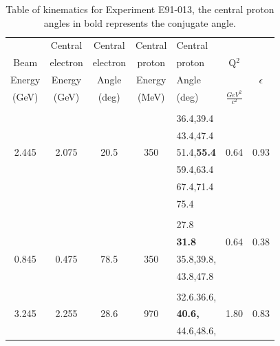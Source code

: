 \documentclass[aps,prl,twocolumn,showpacs,amsmath,amssymb,floats]{revtex4}
\begin{document}
\begin{table}
\caption[Table of kinematics for Experiment E91-013]{Table of kinematics for 
Experiment E91-013, the central proton angles in bold represents the conjugate
angle.} 
\label{kmat}
\begin{center}
\begin{tabular}{|c|c|c|c|l|c|c|} \hline \hline
       &Central  &Central  & Central& Central   &          &        \\ 
Beam   &electron &electron & proton & proton    &Q$^2$     &        \\
Energy &Energy &Angle    & Energy & Angle     &          &$\epsilon$\\
(GeV)  &(GeV)  &(deg)   &  (MeV) & (deg)          &$\frac{GeV^2}{c^2}$ & \\ \hline 
\hline
       &         &         &        &           &          &         \\
       &         &         &        & 36.4,39.4 &          &         \\
       &         &         &        & 43.4,47.4 &          &         \\
 2.445 & 2.075   & 20.5    &  350   &51.4,\bf{55.4}& 0.64     & 0.93    \\
       &         &         &        & 59.4,63.4 &          &         \\
       &         &         &        & 67.4,71.4 &          &         \\
       &         &         &        & 75.4      &          &         \\ \hline
       &         &         &        &           &          &         \\
       &         &         &        & 27.8      &          &         \\
       &         &         &        & \bf{31.8} & 0.64     & 0.38    \\
 0.845 & 0.475   & 78.5    &  350   & 35.8,39.8,&          &         \\
       &         &         &        & 43.8,47.8 &          &         \\ \hline
       &         &         &        &           &          &         \\
       &         &         &        & 32.6.36.6,&          &         \\
 3.245 & 2.255   & 28.6    &  970   & \bf{40.6},& 1.80     & 0.83    \\
       &         &         &        & 44.6,48.6,&          &         \\

\end{tabular}
\end{center}
\end{table}
\end{document}
